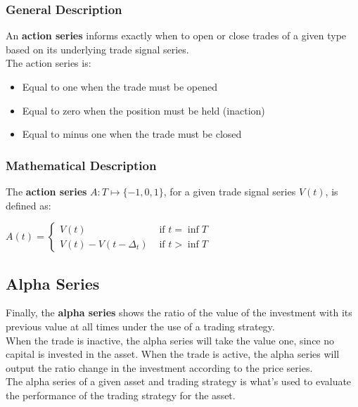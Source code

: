 \documentclass[11pt]{article}
\begin{document}
\subsubsection{General Description}

An \textbf{action series} informs exactly when to open or close trades of a given type based on its underlying trade signal series.\\

The action series is:
\begin{itemize}
    \item Equal to one when the trade must be opened
    \item Equal to zero when the position must be held (inaction)
    \item Equal to minus one when the trade must be closed
\end{itemize}

\subsubsection{Mathematical Description}

The \textbf{action series} $A:T \mapsto \{ -1,0,1 \}$, for a given trade signal series $V(t)$, is defined as:
\begin{center}
    $A(t) = \begin{cases}
V(t) & \text{ if } t= \inf{T}\\ 
V(t) - V(t - \Delta_t) & \text{ if }  t > \inf{T}
\end{cases}$
\end{center}



\subsection{Alpha Series}

Finally, the \textbf{alpha series} shows the ratio of the value of the investment with its previous value at all times under the use of a trading strategy.\\

When the trade is inactive, the alpha series will take the value one, since no capital is invested in the asset. When the trade is active, the alpha series will output the ratio change in the investment according to the price series.\\

The alpha series of a given asset and trading strategy is what's used to evaluate the performance of the trading strategy for the asset.
\end{document}

